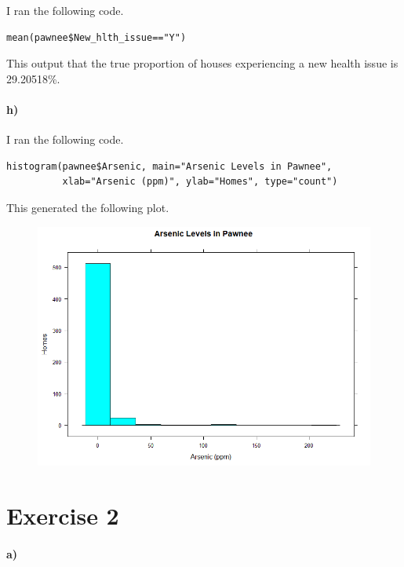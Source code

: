 \documentclass[12pt]{article}
\begin{document}
I ran the following code.
\begin{verbatim}
mean(pawnee$New_hlth_issue=="Y")
\end{verbatim}
This output that the true proportion of houses experiencing a new health issue is 29.20518\%.

\paragraph{h)}

I ran the following code.
\begin{verbatim}
histogram(pawnee$Arsenic, main="Arsenic Levels in Pawnee",
          xlab="Arsenic (ppm)", ylab="Homes", type="count")
\end{verbatim}
This generated the following plot.
\begin{figure}[H]
    \begin{center}
        \includegraphics[width=4.5in]{exercise1h.png}
    \end{center}
\end{figure}

\section*{Exercise 2}

\paragraph{a)}
\end{document}

